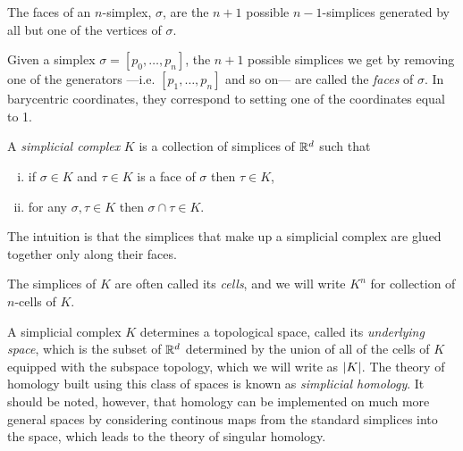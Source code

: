 \documentclass[../main.tex]{subfiles}
\begin{document}
The faces of an \( n \)-simplex, \( \sigma \), are the \( n+1 \) possible \( n-1
\)-simplices generated by all but one of the vertices of \( \sigma \). 


Given a simplex \( \sigma = [p_0, \dots, p_n] \), the \( n+1 \) possible simplices we get by
removing one of the generators ---i.e. \( [p_1, \dots, p_n] \) and so on--- are called the
\emph{faces} of \( \sigma \). In barycentric coordinates, they correspond to setting one of the
coordinates equal to 1. 

\begin{definition}\label{def:simplicial complex}
	A \emph{simplicial complex} \( K \) is a collection of simplices of \( \mathbb{R}^d \) such that 
	\begin{enumerate}[(i)]
		\item if \( \sigma \in K \) and \( \tau \in K \) is a face of \( \sigma \) then \(
			\tau \in K \),
		\item for any \( \sigma, \tau \in K \) then \( \sigma \cap \tau \in K \). 
	\end{enumerate}
\end{definition}
The intuition is that the simplices that make up a simplicial complex are glued together
only along their faces. 

The simplices of \( K \) are often called its \emph{cells}, and we will write \( K^n \)
for collection of \( n \)-cells of \( K \). 

A simplicial complex \( K \) determines a topological space, called its \emph{underlying
space}, which is the subset of \( \mathbb{R}^d \) determined by the union of all of the cells of
\( K \) equipped with the subspace topology, which we will write as \( \left\lvert K \right\rvert \). The
theory of homology built using this class of spaces is known as \emph{simplicial
homology}. It should be noted, however, that homology can be implemented on much more
general spaces by considering continous maps from the standard simplices into the space,
which leads to the theory of singular homology. 
\end{document}
